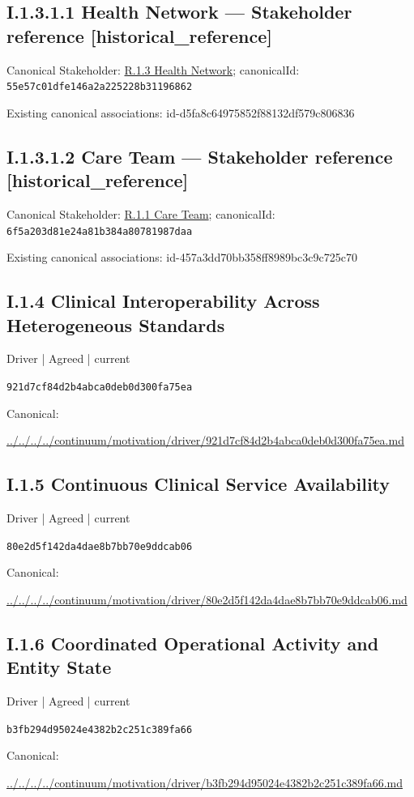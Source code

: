 \documentclass[10pt,a4paper]{article}
\begin{document}
\subsection*{I.1.3.1.1 Health Network — Stakeholder reference [historical\_reference]}
Canonical Stakeholder: \hyperref[element-55e57c01dfe146a2a225228b31196862]{R.1.3 Health Network}; canonicalId: \texttt{55e57c01dfe146a2a225228b31196862}\par
Existing canonical associations: id-d5fa8c64975852f88132df579c806836\par
\subsection*{I.1.3.1.2 Care Team — Stakeholder reference [historical\_reference]}
Canonical Stakeholder: \hyperref[element-6f5a203d81e24a81b384a80781987daa]{R.1.1 Care Team}; canonicalId: \texttt{6f5a203d81e24a81b384a80781987daa}\par
Existing canonical associations: id-457a3dd70bb358ff8989bc3c9c725c70\par
\subsection*{I.1.4 Clinical Interoperability Across Heterogeneous Standards}
\label{element-921d7cf84d2b4abca0deb0d300fa75ea}
{\small Driver | Agreed | current}\par
\texttt{921d7cf84d2b4abca0deb0d300fa75ea}\par
Canonical: \par
{\footnotesize\url{../../../../continuum/motivation/driver/921d7cf84d2b4abca0deb0d300fa75ea.md}}\par
\subsection*{I.1.5 Continuous Clinical Service Availability}
\label{element-80e2d5f142da4dae8b7bb70e9ddcab06}
{\small Driver | Agreed | current}\par
\texttt{80e2d5f142da4dae8b7bb70e9ddcab06}\par
Canonical: \par
{\footnotesize\url{../../../../continuum/motivation/driver/80e2d5f142da4dae8b7bb70e9ddcab06.md}}\par
\subsection*{I.1.6 Coordinated Operational Activity and Entity State}
\label{element-b3fb294d95024e4382b2c251c389fa66}
{\small Driver | Agreed | current}\par
\texttt{b3fb294d95024e4382b2c251c389fa66}\par
Canonical: \par
{\footnotesize\url{../../../../continuum/motivation/driver/b3fb294d95024e4382b2c251c389fa66.md}}\par
\end{document}
